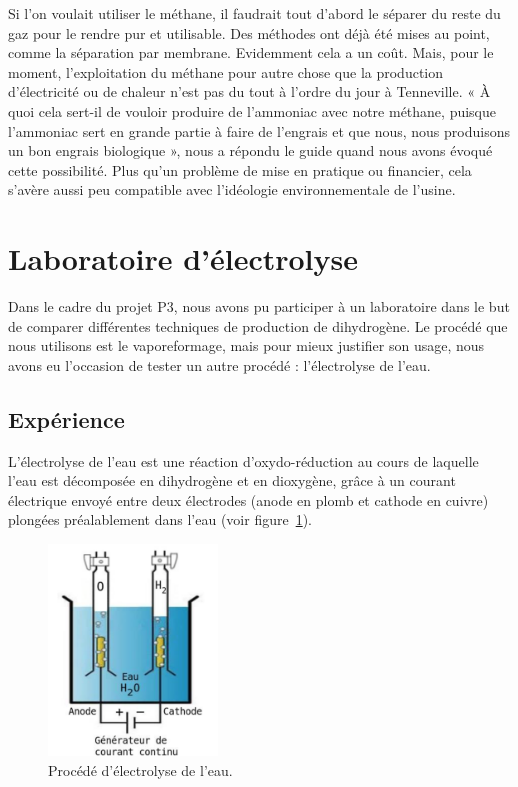 Si l'on voulait utiliser le méthane, il faudrait tout d'abord le séparer du reste du gaz pour le rendre pur et utilisable. Des méthodes ont déjà été mises au point, comme la séparation par membrane. Evidemment cela a un coût.
Mais, pour le moment, l'exploitation du méthane pour autre chose que la production d'électricité ou de chaleur n'est pas du tout à l'ordre du jour à Tenneville. « À quoi cela sert-il de vouloir produire de l'ammoniac avec notre méthane, puisque l'ammoniac sert en grande partie à faire de l'engrais et que nous, nous produisons un bon engrais biologique », nous a répondu le guide quand nous avons évoqué cette possibilité. Plus qu'un problème de mise en pratique ou financier, cela s'avère aussi peu compatible avec l'idéologie environnementale de l'usine.

\section{Laboratoire d'électrolyse}
Dans le cadre du projet P3, nous avons pu participer à un laboratoire dans le but de comparer différentes techniques de production de dihydrogène. Le procédé que nous utilisons est le vaporeformage, mais pour mieux justifier son usage, nous avons eu l'occasion de tester un autre procédé : l'électrolyse de l'eau.

\subsection{Expérience}
L'électrolyse de l'eau est une réaction d'oxydo-réduction au cours de laquelle l'eau est décomposée en dihydrogène et en dioxygène, grâce à un courant électrique envoyé entre deux électrodes (anode en plomb et cathode en cuivre) plongées préalablement dans l'eau (voir figure~\ref{fig:electrolyse}).
\begin{figure}
\centering 
\includegraphics[width=0.4\textwidth]{img/p1}  
\caption{Procédé d'électrolyse de l'eau. \cite{energie-renou}} 
\label{fig:electrolyse}
\end{figure}

